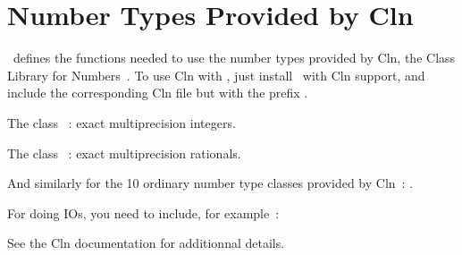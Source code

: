 \section{Number Types Provided by {\sc Cln}}
\label{CLN}


\cgal\ defines the functions needed to use the number types provided by
{\sc Cln}, the Class Library for Numbers~\cite{cln}.
To use {\sc Cln} with \cgal, just install \cgal\ with {\sc Cln} support,
and include the corresponding {\sc Cln} file but with the prefix
.


The class ~: exact multiprecision integers.


The class ~: exact multiprecision rationals.

And similarly for the 10 ordinary number type classes provided by {\sc Cln}~:
.

For doing IOs, you need to include, for example~:


See the {\sc Cln} documentation for additionnal details.
